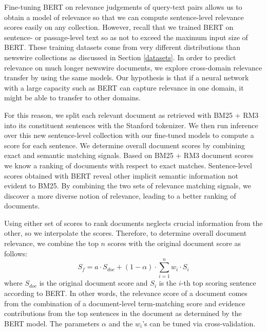 Fine-tuning BERT on relevance judgements of query-text pairs allows us to obtain a model of relevance so that we can compute sentence-level relevance scores easily on any collection.
However, recall that we trained BERT on sentence- or passage-level text so as not to exceed the maximum input size of BERT.
These training datasets come from very different distributions than newswire collections as discussed in Section \ref{datasets}.
In order to predict relevance on much longer newswire documents, we explore cross-domain relevance transfer by using the same models.
Our hypothesis is that if a neural network with a large capacity such as BERT can capture relevance in one domain, it might be able to transfer to other domains.

For this reason, we split each relevant document as retrieved with BM25 + RM3 into its constituent sentences with the Stanford tokenizer.
We then run inference over this new sentence-level collection with our fine-tuned models to compute a score for each sentence.
We determine overall document scores by combining exact and semantic matching signals.
Based on BM25 + RM3 document scores we know a ranking of documents with respect to exact matches.
Sentence-level scores obtained with BERT reveal other implicit semantic information not evident to BM25.
By combining the two sets of relevance matching signals, we discover a more diverse notion of relevance, leading to a better ranking of documents.

Using either set of scores to rank documents neglects crucial information from the other, so we interpolate the scores.
Therefore, to determine overall document relevance, we combine the top $ n $ scores with the original document score as follows:
\begin{equation} \label{eq:1}
S_f = a \cdot S_{doc}  + (1 - \alpha) \cdot \sum_{i = 1}^n w_i \cdot S_i
\end{equation}
\noindent where $ S_{doc} $ is the original document score and $ S_i $ is the $ i $-th top scoring sentence according to BERT.
In other words, the relevance score of a document comes from the combination of a document-level term-matching score and evidence contributions from the top sentences in the document as determined by the BERT model.
The parameters $ \alpha $ and the $ w_i $'s can be tuned via cross-validation.

